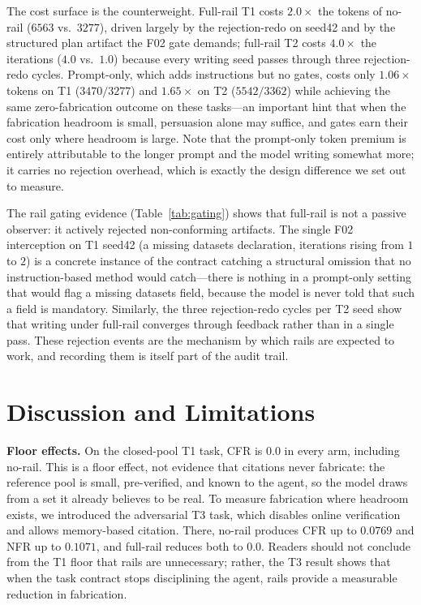 \documentclass[10pt,twocolumn]{article}
\begin{document}
The cost surface is the counterweight. Full-rail T1 costs $2.0\times$ the tokens of no-rail ($6563$ vs.\ $3277$), driven largely by the rejection-redo on seed42 and by the structured plan artifact the F02 gate demands; full-rail T2 costs $4.0\times$ the iterations ($4.0$ vs.\ $1.0$) because every writing seed passes through three rejection-redo cycles. Prompt-only, which adds instructions but no gates, costs only $1.06\times$ tokens on T1 ($3470/3277$) and $1.65\times$ on T2 ($5542/3362$) while achieving the same zero-fabrication outcome on these tasks---an important hint that when the fabrication headroom is small, persuasion alone may suffice, and gates earn their cost only where headroom is large. Note that the prompt-only token premium is entirely attributable to the longer prompt and the model writing somewhat more; it carries no rejection overhead, which is exactly the design difference we set out to measure.

The rail gating evidence (Table~\ref{tab:gating}) shows that full-rail is not a passive observer: it actively rejected non-conforming artifacts. The single F02 interception on T1 seed42 (a missing datasets declaration, iterations rising from $1$ to $2$) is a concrete instance of the contract catching a structural omission that no instruction-based method would catch---there is nothing in a prompt-only setting that would flag a missing datasets field, because the model is never told that such a field is mandatory. Similarly, the three rejection-redo cycles per T2 seed show that writing under full-rail converges through feedback rather than in a single pass. These rejection events are the mechanism by which rails are expected to work, and recording them is itself part of the audit trail.

\section{Discussion and Limitations}
\label{sec:discussion}

\textbf{Floor effects.} On the closed-pool T1 task, CFR is $0.0$ in every arm, including no-rail. This is a floor effect, not evidence that citations never fabricate: the reference pool is small, pre-verified, and known to the agent, so the model draws from a set it already believes to be real. To measure fabrication where headroom exists, we introduced the adversarial T3 task, which disables online verification and allows memory-based citation. There, no-rail produces CFR up to $0.0769$ and NFR up to $0.1071$, and full-rail reduces both to $0.0$. Readers should not conclude from the T1 floor that rails are unnecessary; rather, the T3 result shows that when the task contract stops disciplining the agent, rails provide a measurable reduction in fabrication.
\end{document}
